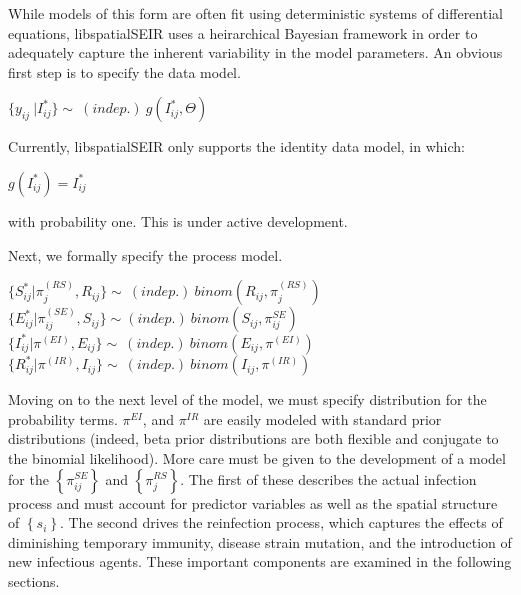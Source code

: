 \documentclass[12pt]{article}
\newcommand \noi {\noindent}
\newcommand \mbreak {\\ \vspace{0.1in}}
\begin{document}
    While models of this form are often fit using deterministic systems of differential equations, libspatialSEIR uses
    a heirarchical Bayesian framework in order to adequately capture the inherent variability in the model parameters.
    An obvious first step is to specify the data model. 

    \vspace{0.15in}

    \begin{center}
        $ \{y_{ij}\ | I^*_{ij}\} \sim\ (indep.)\ g(I^*_{ij}, \Theta)  $
    \end{center}

    Currently, libspatialSEIR only supports the identity data model, in which: 
    \begin{center}
        $g(I^*_{ij}) = I^*_{ij}$  
    \end{center}
    with probability one. This is under active development. \\

    \vspace{0.15in}

    Next, we formally specify the process model. 
    \vspace{0.15in}

        \noi

        $\{S_{ij}^* | \pi_j^{(RS)}, R_{ij}\} \sim\ (indep.)\  binom(R_{ij}, \pi_j^{(RS)})$\mbreak
        $\{E_{ij}^* | \pi^{(SE)}_{ij}, S_{ij} \} \sim (indep.)\ binom(S_{ij}, \pi^{SE}_{ij})$ \mbreak
        $\{I_{ij}^* | \pi^{(EI)}, E_{ij} \} \sim\ (indep.)\ binom(E_{ij}, \pi^{(EI)})$\mbreak
        $\{R_{ij}^* | \pi^{(IR)}, I_{ij}\} \sim\ (indep.)\ binom(I_{ij}, \pi^{(IR)})$\mbreak


        Moving on to the next level of the model, we must specify distribution for the probability terms. $\pi^{EI}$, and $\pi^{IR}$ are easily modeled with standard prior distributions (indeed, beta prior distributions are both flexible and conjugate to the binomial likelihood).  
More care must be given to the development of a model for the $\left\{\pi^{SE}_{ij} \right\}$ and $\left\{\pi^{RS}_j \right\}$. The first of
these describes the actual infection process and must account for predictor variables as well as the 
spatial structure of $\left\{ s_i \right\}$. The second drives the reinfection process, which captures the effects of diminishing temporary immunity, 
disease strain mutation, and the introduction of new infectious agents. These important components are examined in the following sections. 
\end{document}
